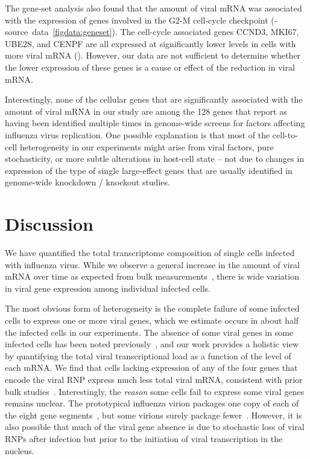 \documentclass[9pt,lineno]{elife}
\begin{document}
The gene-set analysis also found that the amount of viral mRNA was associated with the expression of genes involved in the G2-M cell-cycle checkpoint (-source~data~\ref{figdata:geneset}).
The cell-cycle associated genes CCND3, MKI67, UBE2S, and CENPF are all expressed at significantly lower levels in cells with more viral mRNA ().
However, our data are not sufficient to determine whether the lower expression of these genes is a cause or effect of the reduction in viral mRNA.

Interestingly, none of the cellular genes that are significantly associated with the amount of viral mRNA in our study are among the 128 genes that \citet{watanabe2010cellular} report as having been identified multiple times in genome-wide screens for factors affecting influenza virus replication.
One possible explanation is that most of the cell-to-cell heterogeneity in our experiments might arise from viral factors, pure stochasticity, or more subtle alterations in host-cell state -- not due to changes in expression of the type of single large-effect genes that are usually identified in genome-wide knockdown / knockout studies.

\section{Discussion}
We have quantified the total transcriptome composition of single cells infected with influenza virus.
While we observe a general increase in the amount of viral mRNA over time as expected from bulk measurements~\citep{hatada1989control,Shapiro:1987ur}, there is wide variation in viral gene expression among individual infected cells.

The most obvious form of heterogeneity is the complete failure of some infected cells to express one or more viral genes, which we estimate occurs in about half the infected cells in our experiments.
The absence of some viral genes in some infected cells has been noted previously~\citep{Brooke:2013kb,Heldt:2015iz,Dou:2017cp}, and our work provides a holistic view by quantifying the total viral transcriptional load as a function of the level of each mRNA.
We find that cells lacking expression of any of the four genes that encode the viral RNP express much less total viral mRNA, consistent with prior bulk studies~\citep{Vreede:2004ip,eisfeld2015centre}.
Interestingly, the \emph{reason} some cells fail to express some viral genes remains unclear.
The prototypical influenza virion packages one copy of each of the eight gene segments~\citep{noda2006architecture,hutchinson2010genome}, but some virions surely package fewer~\citep{brooke2014influenza}.
However, it is also possible that much of the viral gene absence is due to stochastic loss of viral RNPs after infection but prior to the initiation of viral transcription in the nucleus.
\end{document}
